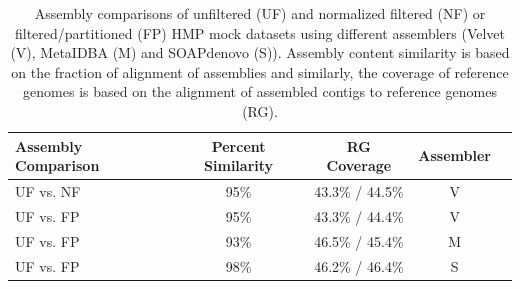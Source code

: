 \documentclass{pnastwo}
\begin{document}
\begin{table}
\caption{Assembly comparisons of unfiltered (UF) and normalized filtered (NF) or
  filtered/partitioned (FP) HMP mock datasets using different
  assemblers (Velvet (V), MetaIDBA (M) and SOAPdenovo (S)).  Assembly
  content similarity is based on the fraction of alignment of
  assemblies and similarly, the coverage of reference genomes is based
  on the alignment of assembled contigs to reference genomes (RG).}
\begin{tabular}{@{\extracolsep{\fill}}lcccc}
Assembly Comparison & Percent Similarity & RG Coverage & Assembler \\
\hline
UF vs. NF & 95\% & 43.3\% / 44.5\% & V \\
UF vs. FP & 95\% & 43.3\% / 44.4\% & V\\
UF vs. FP & 93\% & 46.5\% / 45.4\% & M\\ 
UF vs. FP & 98\% &  46.2\% / 46.4\% & S\\
\hline
\end{tabular}
\label{assembly-compare}
\end{table}
\end{document}
